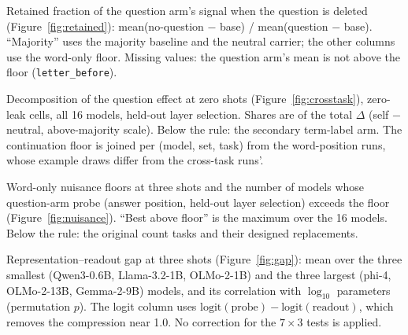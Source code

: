 \begin{table}[!ht]
  \centering\footnotesize
  \setlength{\tabcolsep}{5pt}
  
  \caption{Retained fraction of the question arm's signal when the question is deleted
    (Figure~\ref{fig:retained}): mean(no-question $-$ base) / mean(question $-$ base).
    ``Majority'' uses the majority baseline and the neutral carrier; the other columns use the
    word-only floor. Missing values: the question arm's mean is not above the floor
    (\texttt{letter\_before}).}
  \label{tab:retained}
\end{table}

\begin{table}[!ht]
  \centering\footnotesize
  \setlength{\tabcolsep}{6pt}
  
  \caption{Decomposition of the question effect at zero shots (Figure~\ref{fig:crosstask}),
    zero-leak cells, all 16 models, held-out layer selection. Shares are of the total $\Delta$
    (self $-$ neutral, above-majority scale). Below the rule: the secondary term-label arm. The
    continuation floor is joined per (model, set, task) from the word-position runs, whose example
    draws differ from the cross-task runs'.}
  \label{tab:crosstask}
\end{table}

\begin{table}[!ht]
  \centering\footnotesize
  \setlength{\tabcolsep}{5pt}
  
  \caption{Word-only nuisance floors at three shots and the number of models whose question-arm
    probe (answer position, held-out layer selection) exceeds the floor (Figure~\ref{fig:nuisance}).
    ``Best above floor'' is the maximum over the 16 models. Below the rule: the original count tasks
    and their designed replacements.}
  \label{tab:nuisance}
\end{table}

\begin{table}[!ht]
  \centering\footnotesize
  \setlength{\tabcolsep}{5pt}
  
  \caption{Representation--readout gap at three shots (Figure~\ref{fig:gap}): mean over the three
    smallest (Qwen3-0.6B, Llama-3.2-1B, OLMo-2-1B) and the three largest (phi-4, OLMo-2-13B,
    Gemma-2-9B) models, and its correlation with $\log_{10}$ parameters (permutation $p$). The
    logit column uses $\mathrm{logit}(\text{probe}) - \mathrm{logit}(\text{readout})$, which removes
    the compression near 1.0. No correction for the $7 \times 3$ tests is applied.}
  \label{tab:gap}
\end{table}
